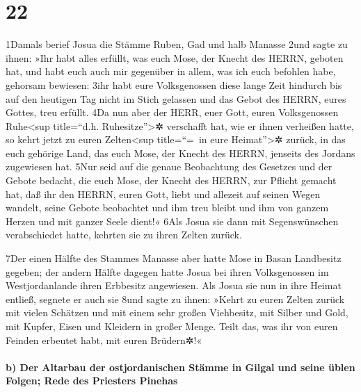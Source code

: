 \hypertarget{section-21}{%
\section{22}\label{section-21}}

1Damals berief Josua die Stämme Ruben, Gad und halb Manasse 2und sagte
zu ihnen: »Ihr habt alles erfüllt, was euch Mose, der Knecht des HERRN,
geboten hat, und habt euch auch mir gegenüber in allem, was ich euch
befohlen habe, gehorsam bewiesen: 3ihr habt eure Volksgenossen diese
lange Zeit hindurch bis auf den heutigen Tag nicht im Stich gelassen und
das Gebot des HERRN, eures Gottes, treu erfüllt. 4Da nun aber der HERR,
euer Gott, euren Volksgenossen Ruhe\textless sup title=``d.h.
Ruhesitze''\textgreater✲ verschafft hat, wie er ihnen verheißen hatte,
so kehrt jetzt zu euren Zelten\textless sup title=``=~in eure
Heimat''\textgreater✲ zurück, in das euch gehörige Land, das euch Mose,
der Knecht des HERRN, jenseits des Jordans zugewiesen hat. 5Nur seid auf
die genaue Beobachtung des Gesetzes und der Gebote bedacht, die euch
Mose, der Knecht des HERRN, zur Pflicht gemacht hat, daß ihr den HERRN,
euren Gott, liebt und allezeit auf seinen Wegen wandelt, seine Gebote
beobachtet und ihm treu bleibt und ihm von ganzem Herzen und mit ganzer
Seele dient!« 6Als Josua sie dann mit Segenswünschen verabschiedet
hatte, kehrten sie zu ihren Zelten zurück.

7Der einen Hälfte des Stammes Manasse aber hatte Mose in Basan
Landbesitz gegeben; der andern Hälfte dagegen hatte Josua bei ihren
Volksgenossen im Westjordanlande ihren Erbbesitz angewiesen. Als Josua
sie nun in ihre Heimat entließ, segnete er auch sie 8und sagte zu ihnen:
»Kehrt zu euren Zelten zurück mit vielen Schätzen und mit einem sehr
großen Viehbesitz, mit Silber und Gold, mit Kupfer, Eisen und Kleidern
in großer Menge. Teilt das, was ihr von euren Feinden erbeutet habt, mit
euren Brüdern✲!«

\hypertarget{b-der-altarbau-der-ostjordanischen-stuxe4mme-in-gilgal-und-seine-uxfcblen-folgen-rede-des-priesters-pinehas}{%
\paragraph{b) Der Altarbau der ostjordanischen Stämme in Gilgal und
seine üblen Folgen; Rede des Priesters
Pinehas}\label{b-der-altarbau-der-ostjordanischen-stuxe4mme-in-gilgal-und-seine-uxfcblen-folgen-rede-des-priesters-pinehas}}

